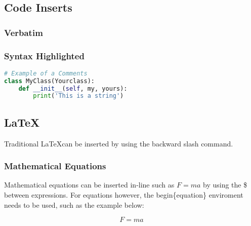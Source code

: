 \documentclass{web_article}
\begin{document}
\subsection{Code Inserts}\label{code-inserts}

\lipsum[2-4]

\subsubsection{Verbatim}\label{verbatim}

\newpage

\subsubsection{Syntax Highlighted}\label{syntax-highlighted}

\begin{lstlisting}[language=Python]
# Example of a Comments
class MyClass(Yourclass):
    def __init__(self, my, yours):
        print('This is a string')
\end{lstlisting}

\newpage

\subsection{\texorpdfstring{\LaTeX}{}}\label{section}

Traditional \LaTeX can be inserted by using the backward slash command.

\subsubsection{Mathematical Equations}\label{mathematical-equations}

Mathematical equations can be inserted in-line such as \(F = ma\) by
using the \$ between expressions. For equations however, the
begin\{equation\} enviroment needs to be used, such as the example
below:

\begin{equation}
F = ma 
\end{equation}
\end{document}
